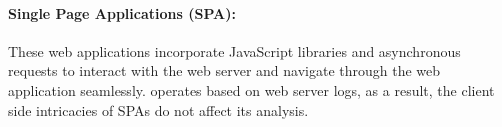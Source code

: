 \paragraph{Single Page Applications (SPA):} 
These web applications incorporate JavaScript libraries and asynchronous requests to interact with the web server and navigate through the web application seamlessly. 
\animatedead{} operates based on web server logs, as a result, the client side intricacies of SPAs do not affect its analysis. 

